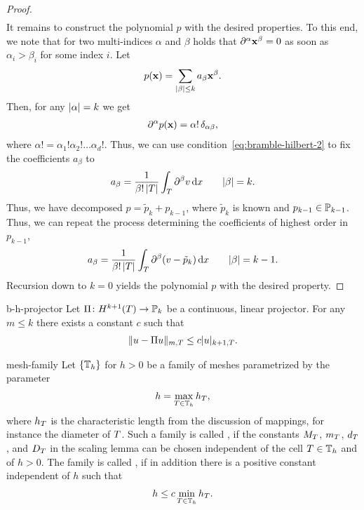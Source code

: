 \begin{proof}
\begin{gather*}
  \end{gather*}
  It remains to construct the polynomial $p$ with the desired
  properties. To this end, we note that for two multi-indices $\alpha$
  and $\beta$ holds that $\d^\alpha \vx^\beta =0$ as soon as
  $\alpha_i>\beta_i$ for some index $i$. Let
  \begin{gather*}
    p(\vx) = \sum_{\abs{\beta}\le k} a_\beta \vx^\beta.
  \end{gather*}
  Then, for any $\abs{\alpha} = k$ we get
  \begin{gather*}
    \d^\alpha p(\vx) = \alpha! \,\delta_{\alpha\beta},
  \end{gather*}
  where $\alpha! = \alpha_1!\alpha_2!\dots\alpha_d!$. Thus, we can use
  condition~\eqref{eq:bramble-hilbert-2} to fix the coefficients
  $a_\beta$ to
  \begin{gather*}
    a_\beta = \frac1{\beta!\,\abs{\cell}} \int_\cell \d^\beta v\dx
    \qquad \abs{\beta} = k.
  \end{gather*}
  Thus, we have decomposed $p = \tilde p_k + p_{k-1}$, where
  $\tilde p_k$ is known and $p_{k-1}\in \P_{k-1}$. Thus, we can repeat
  the process determining the coefficients of highest order in
  $p_{k-1}$,
  \begin{gather*}
    a_\beta = \frac1{\beta!\,\abs{\cell}} \int_\cell \d^\beta (v-\tilde p_k)\dx
    \qquad \abs{\beta} = k-1.
  \end{gather*}
  Recursion down to $k=0$ yields the polynomial $p$ with the desired property.
\end{proof}

\begin{Corollary}{b-h-projector}
  Let $\Pi\colon H^{k+1}(\cell) \to \P_k$ be a continuous, linear
  projector. For any $m\le k$ there exists a constant $c$ such that
  \begin{gather}
    \norm{u-\Pi u}_{m,\cell} \le c \snorm{u}_{k+1,\cell}.
  \end{gather}
\end{Corollary}

\begin{Definition}{mesh-family}
  Let $\{\mesh_h\}$ for $h>0$ be a family of meshes parametrized by
  the parameter
  \begin{gather}
    h = \max_{\cell\in\mesh_h} h_\cell,
  \end{gather}
  where $h_\cell$ is the characteristic length from the discussion of
  mappings, for instance the diameter of $\cell$. Such a family is
  called , if the constants $M_\cell$,
  $m_\cell$, $d_\cell$, and $D_\cell$ in the scaling lemma
  can be chosen independent of the cell $\cell\in\mesh_h$ and of
  $h>0$. The family is called , if in addition
  there is a positive constant independent of $h$ such that
  \begin{gather}
    h \le c \min_{\cell\in\mesh_h} h_\cell.
  \end{gather}
\end{Definition}

